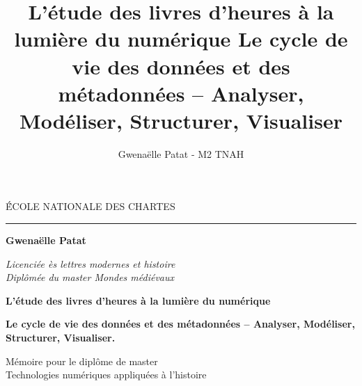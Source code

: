 \documentclass[a4paper,12pt,twoside]{book}
\author{Gwenaëlle Patat - M2 TNAH}
\title{L’étude des livres d’heures à la lumière du numérique
Le cycle de vie des données et des métadonnées – Analyser, Modéliser, Structurer, Visualiser}
\begin{document}
	\frontmatter
	\begin{titlepage}
		\begin{center}
			
			\bigskip
			
			\begin{large}
				\'ÉCOLE NATIONALE DES CHARTES
			\end{large}
			\begin{center}\rule{2cm}{0.02cm}\end{center}
			
			\bigskip
			\bigskip
			\bigskip
			\begin{Large}
				\textbf{Gwenaëlle Patat}\\
			\end{Large}
			\begin{normalsize} \textit{Licenciée ès lettres modernes et histoire}\\
				\textit{Diplômée du master \og{}Mondes médiévaux\fg{}}
			\end{normalsize}
			
			\bigskip
			\bigskip
			\bigskip
			
			\begin{Huge}
				\textbf{L’étude des livres d’heures à la lumière du numérique}\\
			\end{Huge}
			\bigskip
			\bigskip
			\begin{LARGE}
				\textbf{Le cycle de vie des données et des métadonnées – Analyser, Modéliser, Structurer, Visualiser.}\\
			\end{LARGE}
			
			\bigskip
			\bigskip
			\bigskip
			\begin{large}
			\end{large}
			\vfill
			
			\begin{large}
				Mémoire 
				pour le diplôme de master \\
				\og{} Technologies numériques appliquées à l'histoire \fg{} \\
			\end{large}
			
		\end{center}
	\end{titlepage}
	
	\thispagestyle{empty}	
	\cleardoublepage
	
\end{document}
